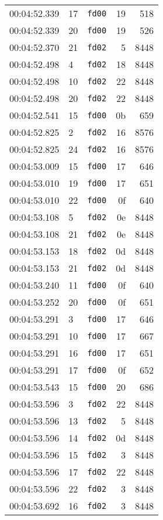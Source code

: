 \documentclass{article}
\begin{document}
\begin{longtable}{lllrr}
00:04:52.339 & 17 & \texttt{fd00} & 19 & 518 \\
00:04:52.339 & 20 & \texttt{fd00} & 19 & 526 \\
00:04:52.370 & 21 & \texttt{fd02} & 5 & 8448 \\
00:04:52.498 & 4 & \texttt{fd02} & 18 & 8448 \\
00:04:52.498 & 10 & \texttt{fd02} & 22 & 8448 \\
00:04:52.498 & 20 & \texttt{fd02} & 22 & 8448 \\
00:04:52.541 & 15 & \texttt{fd00} & 0b & 659 \\
00:04:52.825 & 2 & \texttt{fd02} & 16 & 8576 \\
00:04:52.825 & 24 & \texttt{fd02} & 16 & 8576 \\
00:04:53.009 & 15 & \texttt{fd00} & 17 & 646 \\
00:04:53.010 & 19 & \texttt{fd00} & 17 & 651 \\
00:04:53.010 & 22 & \texttt{fd00} & 0f & 640 \\
00:04:53.108 & 5 & \texttt{fd02} & 0e & 8448 \\
00:04:53.108 & 21 & \texttt{fd02} & 0e & 8448 \\
00:04:53.153 & 18 & \texttt{fd02} & 0d & 8448 \\
00:04:53.153 & 21 & \texttt{fd02} & 0d & 8448 \\
00:04:53.240 & 11 & \texttt{fd00} & 0f & 640 \\
00:04:53.252 & 20 & \texttt{fd00} & 0f & 651 \\
00:04:53.291 & 3 & \texttt{fd00} & 17 & 646 \\
00:04:53.291 & 10 & \texttt{fd00} & 17 & 667 \\
00:04:53.291 & 16 & \texttt{fd00} & 17 & 651 \\
00:04:53.291 & 17 & \texttt{fd00} & 0f & 652 \\
00:04:53.543 & 15 & \texttt{fd00} & 20 & 686 \\
00:04:53.596 & 3 & \texttt{fd02} & 22 & 8448 \\
00:04:53.596 & 13 & \texttt{fd02} & 5 & 8448 \\
00:04:53.596 & 14 & \texttt{fd02} & 0d & 8448 \\
00:04:53.596 & 15 & \texttt{fd02} & 3 & 8448 \\
00:04:53.596 & 17 & \texttt{fd02} & 22 & 8448 \\
00:04:53.596 & 22 & \texttt{fd02} & 3 & 8448 \\
00:04:53.692 & 16 & \texttt{fd02} & 3 & 8448 \\

\end{longtable}
\end{document}
